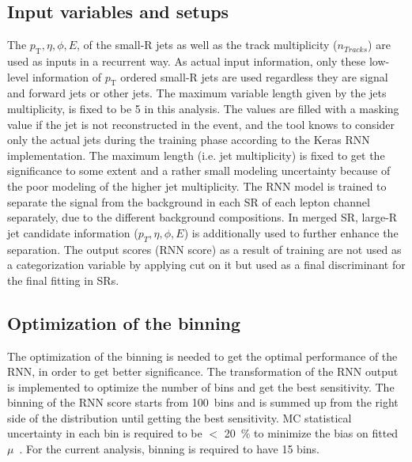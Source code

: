 \subsection{Input variables and setups}
The $p_\mathrm{T}, \eta, \phi, E$, of the small-R jets as well as the track multiplicity ($n_{Tracks}$) are used as inputs in a recurrent way. 
As actual input information, only these low-level information of $p_\mathrm{T}$ ordered small-R jets are used regardless they are signal and forward jets or other jets. 
The maximum variable length given by the jets multiplicity, is fixed to be 5 in this analysis. 
The values are filled with a masking value if the jet is not reconstructed in the event, and the tool knows to consider only the actual jets during the training phase according to the Keras RNN implementation. 
The maximum length (i.e. jet multiplicity) is fixed to get the significance to some extent and a rather small modeling uncertainty because of the poor modeling of the higher jet multiplicity.
The RNN model is trained to separate the signal from the background in each SR of each lepton channel separately, due to the different background compositions. 
In merged SR, large-R jet candidate information ($p_T, \eta, \phi, E$) is additionally used to further enhance the separation.
The output scores (RNN score) as a result of training are not used as a categorization variable by applying cut on it but used as a final discriminant for the final fitting in SRs. 

\subsection{Optimization of the binning}
The optimization of the binning is needed to get the optimal performance of the RNN, in order to get better significance. 
The transformation of the RNN output \cite{ATL-PHYS-PUB-2019-009} is implemented to optimize the number of bins and get the best sensitivity.
The binning of the RNN score starts from 100~bins and is summed up from the right side of the distribution until getting the best sensitivity. 
MC statistical uncertainty in each bin is required to be $<$ 20~\% to minimize the bias on fitted $\mu$~\cite{ATL-PHYS-PUB-2019-009}. 
For the current analysis, binning is required to have 15 bins.